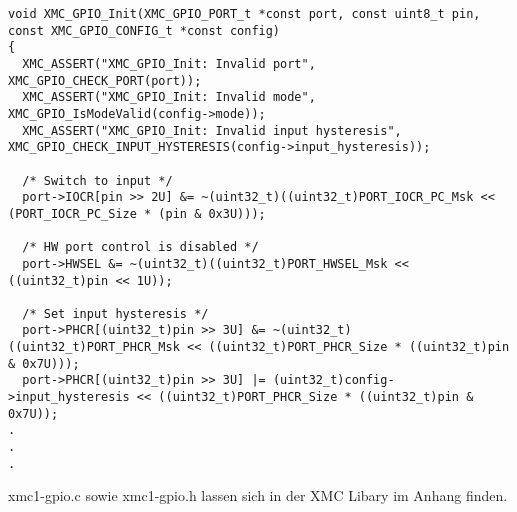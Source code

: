 	
\begin{minipage}{1\textwidth}
\begin{lstlisting}
void XMC_GPIO_Init(XMC_GPIO_PORT_t *const port, const uint8_t pin, const XMC_GPIO_CONFIG_t *const config)
{
  XMC_ASSERT("XMC_GPIO_Init: Invalid port", XMC_GPIO_CHECK_PORT(port));
  XMC_ASSERT("XMC_GPIO_Init: Invalid mode", XMC_GPIO_IsModeValid(config->mode));
  XMC_ASSERT("XMC_GPIO_Init: Invalid input hysteresis", XMC_GPIO_CHECK_INPUT_HYSTERESIS(config->input_hysteresis));
  
  /* Switch to input */
  port->IOCR[pin >> 2U] &= ~(uint32_t)((uint32_t)PORT_IOCR_PC_Msk << (PORT_IOCR_PC_Size * (pin & 0x3U)));

  /* HW port control is disabled */
  port->HWSEL &= ~(uint32_t)((uint32_t)PORT_HWSEL_Msk << ((uint32_t)pin << 1U));

  /* Set input hysteresis */
  port->PHCR[(uint32_t)pin >> 3U] &= ~(uint32_t)((uint32_t)PORT_PHCR_Msk << ((uint32_t)PORT_PHCR_Size * ((uint32_t)pin & 0x7U)));
  port->PHCR[(uint32_t)pin >> 3U] |= (uint32_t)config->input_hysteresis << ((uint32_t)PORT_PHCR_Size * ((uint32_t)pin & 0x7U));
.
.
.    
\end{lstlisting}
\label{fig:oAPI}
\end{minipage}

xmc1-gpio.c sowie xmc1-gpio.h lassen sich in der XMC Libary im Anhang finden.

